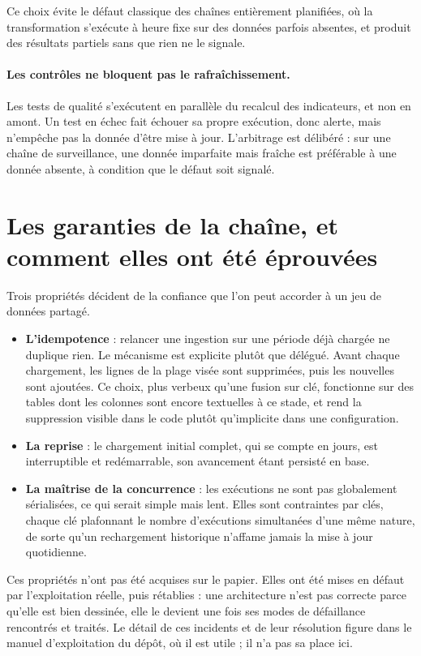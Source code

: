 Ce choix évite le défaut classique des chaînes entièrement planifiées, où la transformation
s'exécute à heure fixe sur des données parfois absentes, et produit des résultats partiels sans
que rien ne le signale.

\paragraph{Les contrôles ne bloquent pas le rafraîchissement.} Les tests de qualité s'exécutent
en parallèle du recalcul des indicateurs, et non en amont. Un test en échec fait échouer sa
propre exécution, donc alerte, mais n'empêche pas la donnée d'être mise à jour. L'arbitrage est
délibéré : sur une chaîne de surveillance, une donnée imparfaite mais fraîche est préférable à
une donnée absente, à condition que le défaut soit signalé.

\section{Les garanties de la chaîne, et comment elles ont été éprouvées}

Trois propriétés décident de la confiance que l'on peut accorder à un jeu de données partagé.

\begin{itemize}
  \item \textbf{L'idempotence} : relancer une ingestion sur une période déjà chargée ne duplique
  rien. Le mécanisme est explicite plutôt que délégué. Avant chaque chargement, les lignes de la
  plage visée sont supprimées, puis les nouvelles sont ajoutées. Ce choix, plus verbeux qu'une
  fusion sur clé, fonctionne sur des tables dont les colonnes sont encore textuelles à ce stade,
  et rend la suppression visible dans le code plutôt qu'implicite dans une configuration.
  \item \textbf{La reprise} : le chargement initial complet, qui se compte en jours, est
  interruptible et redémarrable, son avancement étant persisté en base.
  \item \textbf{La maîtrise de la concurrence} : les exécutions ne sont pas globalement
  sérialisées, ce qui serait simple mais lent. Elles sont contraintes par clés, chaque clé
  plafonnant le nombre d'exécutions simultanées d'une même nature, de sorte qu'un rechargement
  historique n'affame jamais la mise à jour quotidienne.
\end{itemize}

Ces propriétés n'ont pas été acquises sur le papier. Elles ont été mises en défaut par
l'exploitation réelle, puis rétablies : une architecture n'est pas correcte parce qu'elle est
bien dessinée, elle le devient une fois ses modes de défaillance rencontrés et traités. Le
détail de ces incidents et de leur résolution figure dans le manuel d'exploitation du dépôt, où
il est utile ; il n'a pas sa place ici.

